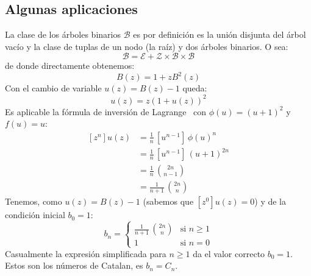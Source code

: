 \subsection{Algunas aplicaciones}
\label{sec:ms-ogf-aplicaciones}

  La clase de los árboles binarios \(\mathscr{B}\)
  es por definición es la unión disjunta del árbol vacío
  y la clase de tuplas de un nodo (la raíz)
  y dos árboles binarios.
  O sea:
  \begin{equation*}
    \mathscr{B}
      = \mathscr{E}
          + \mathscr{Z} \times \mathscr{B} \times \mathscr{B}
  \end{equation*}
  de donde directamente obtenemos:
  \begin{equation*}
    B(z)
      = 1 + z B^2(z)
  \end{equation*}
  Con el cambio de variable \(u(z) = B(z) - 1\) queda:
  \begin{equation*}
    u(z)
      = z (1 + u(z))^2
  \end{equation*}
  Es aplicable la fórmula de inversión de Lagrange~%
    \cite[teorema~17.8]{brand17:_fundamentos_informatica}
  con \(\phi(u) = (u + 1)^2\) y \(f(u) = u\):
  \begin{align*}
    \left[ z^n \right] u(z)
      &= \frac{1}{n} \, \left[ u^{n - 1} \right] \, \phi(u)^n \\
      &= \frac{1}{n} \, \left[ u^{n - 1} \right] \, (u + 1)^{2 n} \\
      &= \frac{1}{n} \, \binom{2 n}{n - 1} \\
      &= \frac{1}{n + 1} \, \binom{2 n}{n}
  \end{align*}
  Tenemos,
  como \(u(z) = B(z) - 1\)
  (sabemos que \([z^0] u(z) = 0\))
  y de la condición inicial \(b_0 = 1\):
  \begin{equation*}
    b_n =
    \begin{cases}
      \displaystyle
        \frac{1}{n + 1} \, \binom{2 n}{n}
               & \text{si \(n \ge 1\)} \\
      1
               & \text{si \(n = 0\)}
    \end{cases}
  \end{equation*}
  Casualmente la expresión simplificada para \(n \ge 1\)
  da el valor correcto \(b_0 = 1\).
  Estos son los números de Catalan,
  es \(b_n = C_n\).

